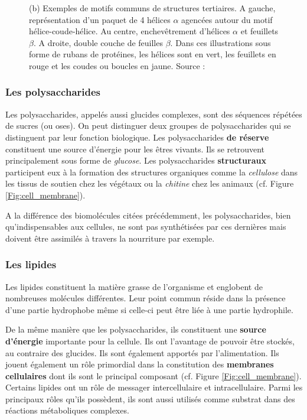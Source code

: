 \begin{figure}[h]
{  (b) Exemples de motifs communs de structures tertiaires. A gauche, représentation d'un paquet de 4 hélices $\alpha$ agencées autour du motif hélice-coude-hélice. Au centre, enchevêtrement d'hélices $\alpha$ et feuillets $\beta$. A droite, double couche de feuilles $\beta$. Dans ces illustrations sous forme de rubans de protéines, les hélices sont en vert, les feuillets en rouge et les coudes ou boucles en jaune. Source : \cite{alberts2013essential}
  }
\end{figure}

\subsubsection{Les polysaccharides}

Les polysaccharides, appelés aussi glucides complexes, sont des séquences répétées de sucres (ou oses). On peut distinguer deux groupes de polysaccharides qui se distinguent par leur fonction biologique. Les polysaccharides \textbf{de réserve} constituent une source d'énergie pour les êtres vivants. Ils se retrouvent principalement sous forme de \textit{glucose}.
Les polysaccharides \textbf{structuraux} participent eux à la formation des structures organiques comme la \textit{cellulose} dans les tissus de soutien chez les végétaux ou la \textit{chitine} chez les animaux (cf. Figure \ref{Fig:cell_membrane}).

A la différence des biomolécules citées précédemment, les polysaccharides, bien qu'indispensables aux cellules, ne sont pas synthétisées par ces dernières mais doivent être assimilés à travers la nourriture par exemple.

\subsubsection{Les lipides}

Les lipides constituent la matière grasse de l'organisme et englobent de nombreuses molécules différentes. Leur point commun réside dans la présence d'une partie hydrophobe même si celle-ci peut être liée à une partie hydrophile.

De la même manière que les polysaccharides, ils constituent une \textbf{source d'énergie} importante pour la cellule. Ils ont l'avantage de pouvoir être stockés, au contraire des glucides. Ils sont également apportés par l'alimentation.
Ils jouent également un rôle primordial dans la constitution des \textbf{membranes cellulaires} dont ils sont le principal composant (cf. Figure \ref{Fig:cell_membrane}).
Certains lipides ont un rôle de messager intercellulaire et intracellulaire.
Parmi les principaux rôles qu'ils possèdent, ils sont aussi utilisés comme substrat dans des réactions métaboliques complexes.

